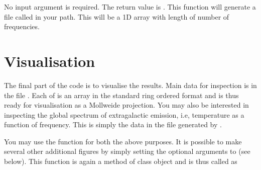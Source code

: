 \documentclass[letterpaper,10pt,english]{sphinxmanual}
\begin{document}
\begin{sphinxVerbatim}[commandchars=\\\{\}]
\end{sphinxVerbatim}

\sphinxAtStartPar
No input argument is required. The return value is . This
function will generate a file called  in your path. This
will be a 1D array with length of number of frequencies.


\section{Visualisation}
\label{\detokenize{detexp:visualisation}}
\sphinxAtStartPar
The final part of the code is to visualise the results. Main data for
inspection is in the file . Each of 
is an array in the standard ring ordered  format and is thus
ready for visualisation as a Mollweide projection. You may also be
interested in inspecting the global spectrum of extragalactic emission,
i.e, temperature as a function of frequency. This is simply the data in
the file  generated by .

\sphinxAtStartPar
You may use the function  for both the above purposes. It is
possible to make several other additional figures by simply setting the
optional arguments to  (see below). This function is again a
method of class object  and is thus called as

\begin{sphinxVerbatim}[commandchars=\\\{\}]
  
\end{sphinxVerbatim}
\end{document}
